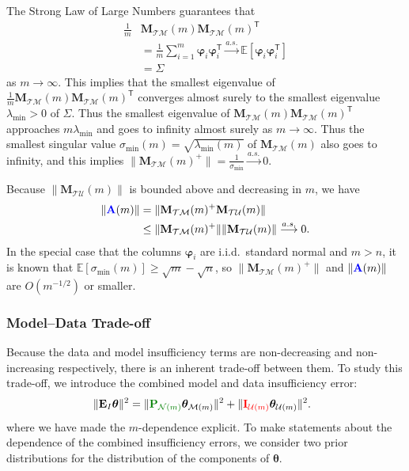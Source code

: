 \documentclass[twocolumn,aps,prx,superscriptaddress,10pt]{revtex4-2}
\newcommand{\0}{\bm{0}}
\newcommand{\bphi}{\boldsymbol{\varphi}}
\newcommand{\btheta}{\boldsymbol{\theta}}
\newcommand{\M}{\mathcal{M}} %
\newcommand{\K}{\mathcal{N}} %
\newcommand{\T}{\mathcal{T}} %
\newcommand{\U}{\mathcal{U}} %
\newcommand{\bbA}{{\color{blue}{\mathbf{A}}}}  %
\newcommand{\bbE}{\mathbf{E}}
\newcommand{\bbI}{\mathbf{I}}
\newcommand{\bbM}{\mathbf{M}}
\newcommand{\bbP}{\mathbf{P}}
\newcommand{\MTM}{\bbM_{\T\M}}
\newcommand{\MTU}{\bbM_{\T\U}}
\newcommand{\trp}{^{\mathsf{T}}}  %
\newcommand{\ev}{\mathbb{E}} %
\begin{document}
The Strong Law of Large Numbers guarantees that 
\begin{align*}
\frac{1}{m} &\MTM(m) \MTM(m)\trp \\
&= \frac{1}{m} \sum_{i=1}^m \bphi_i\bphi_i\trp \stackrel{a.s.}{\longrightarrow} \ev 
[\bphi_i\bphi_i\trp]\\
& = \Sigma
\end{align*}
as $m\to \infty$.  This implies that the smallest eigenvalue of 
$\frac{1}{m} \MTM(m)\MTM(m)\trp$ converges almost surely to the smallest eigenvalue $\lambda_{\mathrm{min}}>0$ of $\Sigma$.  Thus the smallest eigenvalue of $\MTM(m) \MTM(m)\trp$ approaches $m \lambda_{\mathrm{min}}$ and goes to infinity almost surely as $m\to \infty$.
Thus the smallest singular value $\sigma_{\mathrm{min}}(m) = \sqrt{\lambda_{\mathrm{min}}(m)}$ of $\MTM(m)$ also goes to infinity, and this implies
$
\|\MTM(m)^+\| = \frac{1}{\sigma_{\mathrm{min}}} \stackrel{a.s.}{\longrightarrow} 0$.

Because $\|\MTU(m)\|$ is bounded above and decreasing in $m$, we have 
\begin{align*}
\|\bbA(m) \| &=  \|\MTM(m)^+ \MTU(m)\|\\
& \le \|\MTM(m)^+\| \|\MTU(m)\| \stackrel{a.s.}{\longrightarrow} 0.
\end{align*}
In the special case that the columns $\bphi_i$ are i.i.d.~standard normal and $m>n$, it is known \cite[Thm 2.6]{Vershynin} that $\ev[\sigma_{\mathrm{min}}(m)] \ge \sqrt{m} - \sqrt{n}$, so $\|\MTM(m)^+\|$ and $\|\bbA(m)\|$ are $O(m^{-1/2})$ or smaller.

\subsubsection{Model--Data Trade-off}
\label{sec:overmodeling}

Because the data and model insufficiency terms are non-decreasing and non-increasing respectively, there is an inherent trade-off between them.
To study this trade-off, we introduce the combined model and data insufficiency error: %
\begin{align}
  \
  \| \bbE_I \btheta \|^2 & = \| {\color{Green}{\bbP_{\K(m)}}} \btheta_{\M(m)} \|^2 + \| {\color{red}{\bbI_{\U(m)}}} \btheta_{\U(m)} \|^2.
\end{align}
where we have made the $m$-dependence explicit.
To make statements about the dependence of the combined insufficiency errors, we consider two prior distributions for the distribution of the components of $\btheta$.
\end{document}
